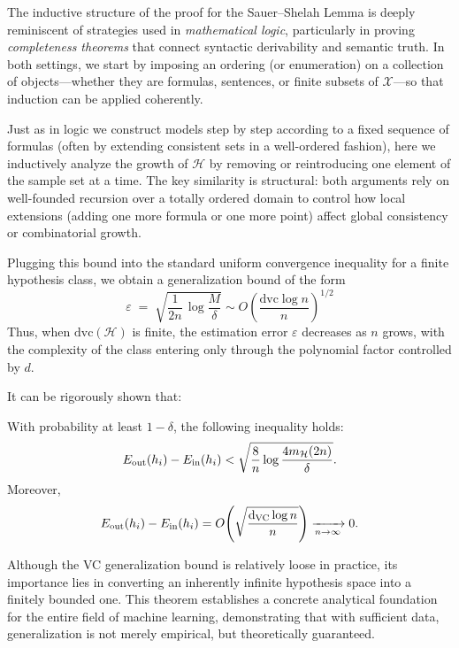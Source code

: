 \documentclass[../main]{subfiles}
\begin{document}
    \begin{note}
        The inductive structure of the proof for the Sauer--Shelah Lemma is deeply reminiscent
        of strategies used in \emph{mathematical logic}, particularly in proving
        \emph{completeness theorems} that connect syntactic derivability and semantic truth.
        In both settings, we start by imposing an ordering (or enumeration) on a collection
        of objects—whether they are formulas, sentences, or finite subsets of $\mathcal{X}$—so that
        induction can be applied coherently.
        
        Just as in logic we construct models step by step according to a fixed sequence
        of formulas (often by extending consistent sets in a well-ordered fashion),
        here we inductively analyze the growth of $\mathcal{H}$ by removing or reintroducing one
        element of the sample set at a time.  
        The key similarity is structural: both arguments rely on well-founded recursion over
        a totally ordered domain to control how local extensions (adding one more formula or one more
        point) affect global consistency or combinatorial growth.
        \end{note}
        
    \begin{remark}
    Plugging this bound into the standard uniform convergence inequality
    for a finite hypothesis class, we obtain a generalization bound of the form
    \begin{equation}
        \varepsilon
        \;=\;
        \sqrt{\frac{1}{2n}\,\log \frac{M}{\delta}}\sim O\left(\frac{\mathrm{dvc}\log n}{n}\right)^{1/2}
    \end{equation}
    Thus, when $\mathrm{dvc}(\mathcal{H})$ is finite, the estimation error
    $\varepsilon$ decreases as $n$ grows, with the complexity of the class
    entering only through the polynomial factor controlled by $d$.
    \end{remark}
    It can be rigorously shown that:

    \begin{theorem}
    With probability at least $1-\delta$, the following inequality holds:
    \begin{equation}
        E_{\rm out}(h_i) - E_{\rm in}(h_i)
        < \sqrt{\frac{8}{n}\log\frac{4m_{\mathcal{H}}(2n)}{\delta}}.
    \end{equation}
    Moreover,
    \begin{equation}
        E_{\rm out}(h_i) - E_{\rm in}(h_i)
        = O\!\left(\sqrt{\frac{\mathrm{d_{VC}}\log n}{n}}\right)
        \xrightarrow[n\to\infty]{} 0.
    \end{equation}
    \end{theorem}
    
    Although the VC generalization bound is relatively loose in practice,  
    its importance lies in converting an inherently infinite hypothesis space into a finitely bounded one.  
    This theorem establishes a concrete analytical foundation for the entire field of machine learning,  
    demonstrating that with sufficient data, generalization is not merely empirical, but theoretically guaranteed.
\end{document}
